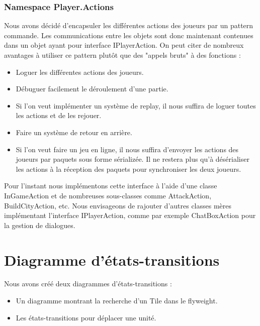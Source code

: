 				\subsubsection{Namespace Player.Actions}
Nous avons décidé d'encapsuler les différentes actions des joueurs par un pattern commande. 
Les communications entre les objets sont donc maintenant contenues dans un objet ayant pour interface IPlayerAction.
On peut citer de nombreux avantages à utiliser ce pattern plutôt que des "appels bruts" à des fonctions :
\begin{itemize}
\item Loguer les différentes actions des joueurs.
\item Débuguer facilement le déroulement d'une partie.
\item Si l'on veut implémenter un système de replay, il nous suffira de loguer toutes les actions et de les rejouer.
\item Faire un système de retour en arrière.
\item Si l'on veut faire un jeu en ligne, il nous suffira d'envoyer les actions des joueurs par paquets sous forme sérializée. Il ne restera plus qu'à 
désérialiser les actions à la réception des paquets pour synchroniser les deux joueurs.
\end{itemize}

Pour l'instant nous implémentons cette interface à l'aide d'une classe InGameAction et de nombreuses sous-classes comme AttackAction, BuildCityAction, etc.
Nous envisageons de rajouter d'autres classes mères implémentant l'interface IPlayerAction, comme par exemple ChatBoxAction pour la gestion de dialogues.

\section{Diagramme d'états-transitions}
Nous avons créé deux diagrammes d'états-transitions :
\begin{itemize}
\item Un diagramme montrant la recherche d'un Tile dans le flyweight.
\item Les états-transitions pour déplacer une unité.
\end{itemize}


